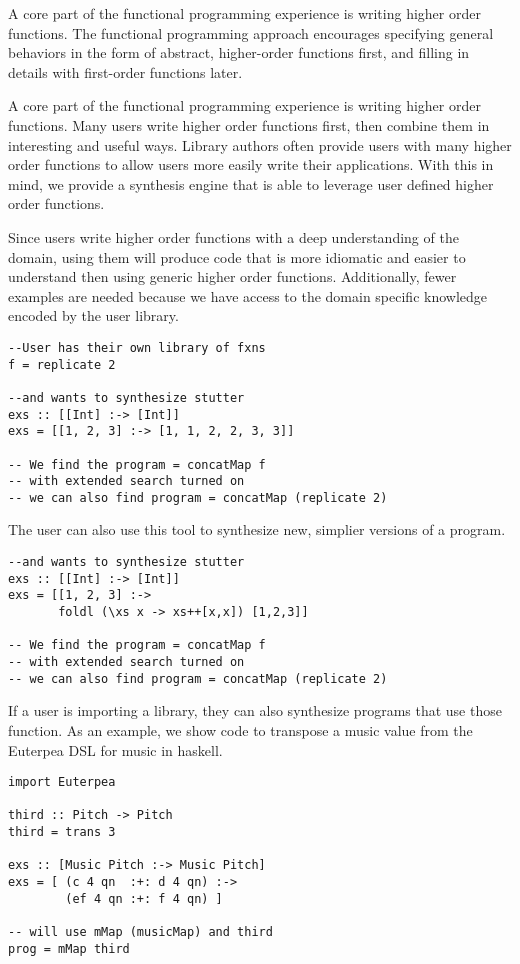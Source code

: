 A core part of the functional programming experience is writing higher order functions. The functional programming approach encourages specifying general behaviors in the form of abstract, higher-order functions first, and filling in details with first-order functions later.

A core part of the functional programming experience is writing higher order functions. Many users write higher order functions first, then combine them in interesting and useful ways. Library authors often provide users with many higher order functions to allow users more easily write their applications. With this in mind, we provide a synthesis engine that is able to leverage user defined higher order functions.

Since users write higher order functions with a deep understanding of the domain, using them will produce code that is more idiomatic and easier to understand then using generic higher order functions. Additionally, fewer examples are needed because we have access to the domain specific knowledge encoded by the user library.

\begin{lstlisting}
--User has their own library of fxns
f = replicate 2

--and wants to synthesize stutter
exs :: [[Int] :-> [Int]]
exs = [[1, 2, 3] :-> [1, 1, 2, 2, 3, 3]]

-- We find the program = concatMap f
-- with extended search turned on
-- we can also find program = concatMap (replicate 2) 
\end{lstlisting}

The user can also use this tool to synthesize new, simplier versions of a program. 

\begin{lstlisting}
--and wants to synthesize stutter
exs :: [[Int] :-> [Int]]
exs = [[1, 2, 3] :->
       foldl (\xs x -> xs++[x,x]) [1,2,3]]

-- We find the program = concatMap f
-- with extended search turned on
-- we can also find program = concatMap (replicate 2) 
\end{lstlisting}


If a user is importing a library, they can also synthesize programs that use those function. As an example, we show code to transpose a music value from the Euterpea DSL for music in haskell.

\begin{lstlisting}
import Euterpea

third :: Pitch -> Pitch
third = trans 3

exs :: [Music Pitch :-> Music Pitch]
exs = [ (c 4 qn  :+: d 4 qn) :->
        (ef 4 qn :+: f 4 qn) ]
        
-- will use mMap (musicMap) and third
prog = mMap third
\end{lstlisting}
